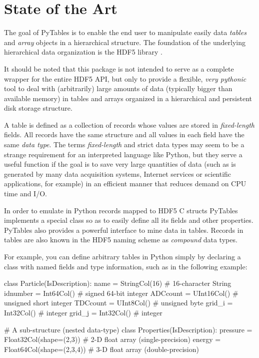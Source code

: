 \section{State of the Art}

The goal of PyTables is to enable the end user to manipulate
easily data \emph{tables} and \emph{array} objects in a 
hierarchical structure. The foundation of the underlying
hierarchical data organization is the HDF5 library \cite{TheHDFGroup2010}.

It should be noted that this package is not intended to serve as a
complete wrapper for the entire HDF5 API, but only to provide a
flexible, \emph{very pythonic} tool to deal with
(arbitrarily) large amounts of data (typically bigger than available
memory) in tables and arrays organized in a hierarchical and persistent
disk storage structure.

A table is defined as a collection of records whose values are
stored in \emph{fixed-length} fields. All records have the
same structure and all values in each field have the same \emph{data type}. 
The terms \emph{fixed-length} and strict data types may seem to be a strange requirement for
an interpreted language like Python, but they serve a useful function if
the goal is to save very large quantities of data (such as is generated
by many data acquisition systems, Internet services or scientific
applications, for example) in an efficient manner that reduces demand on
CPU time and I/O.

In order to emulate in Python records mapped to HDF5 C structs
PyTables implements a special class so as to easily define all its
fields and other properties. PyTables also provides a powerful interface
to mine data in tables. Records in tables are also known in the HDF5
naming scheme as \emph{compound} data types.

For example, you can define arbitrary tables in Python simply by
declaring a class with named fields and type information, such as in the
following example:

\vspace{2.5mm}
\begin{python}
class Particle(IsDescription):
    name      = StringCol(16)   # 16-character String
    idnumber  = Int64Col()      # signed 64-bit integer
    ADCcount  = UInt16Col()     # unsigned short integer
    TDCcount  = UInt8Col()      # unsigned byte
    grid_i    = Int32Col()      # integer
    grid_j    = Int32Col()      # integer

    # A sub-structure (nested data-type)
    class Properties(IsDescription):
        pressure = Float32Col(shape=(2,3)) # 2-D float array (single-precision)
        energy   = Float64Col(shape=(2,3,4)) # 3-D float array (double-precision)
\end{python}
\vspace{2.5mm}


